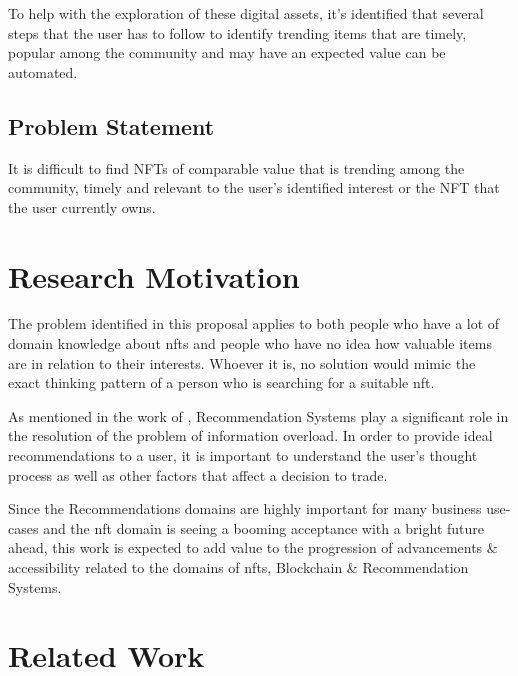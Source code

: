 \bigbreak
To help with the exploration of these digital assets, it's identified that several steps that the user has to follow to identify trending items that are timely, popular among the community and may have an expected value can be automated. 

\subsection{Problem Statement}
It is difficult to find NFTs of comparable value that is trending among the community, timely and relevant to the user’s identified interest or the NFT that the user currently owns.

\section{Research Motivation}
The problem identified in this proposal applies to both people who have a lot of domain knowledge about \gls{nft}s and people who have no idea how valuable items are in relation to their interests. Whoever it is, no solution would mimic the exact thinking pattern of a person who is searching for a suitable \gls{nft}.

As mentioned in the work of \textcite{cheng_hybrid_2020}, Recommendation Systems play a significant role in the resolution of the problem of information overload. In order to provide ideal recommendations to a user, it is important to understand the user's thought process as well as other factors that affect a decision to trade.

Since the Recommendations domains are highly important for many business use-cases and the \gls{nft} domain is seeing a booming acceptance with a bright future ahead, this work is expected to add value to the progression of advancements \& accessibility related to the domains of \gls{nft}s, Blockchain \& Recommendation Systems.

\newpage
\section{Related Work}

